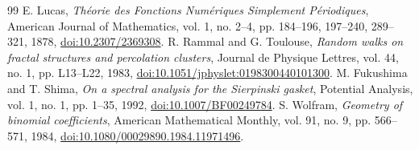\documentclass[11pt,a4paper]{article}
\theoremstyle{plain}
\theoremstyle{definition}
\theoremstyle{remark}
\numberwithin{equation}{section}
\begin{document}
\begin{thebibliography}{99}
 E. Lucas, \emph{Th\'eorie des Fonctions Num\'eriques Simplement P\'eriodiques}, American Journal of Mathematics, vol. 1, no. 2--4, pp. 184--196, 197--240, 289--321, 1878, \href{https://doi.org/10.2307/2369308}{doi:10.2307/2369308}.
 R. Rammal and G. Toulouse, \emph{Random walks on fractal structures and percolation clusters}, Journal de Physique Lettres, vol. 44, no. 1, pp. L13--L22, 1983, \href{https://doi.org/10.1051/jphyslet:0198300440101300}{doi:10.1051/jphyslet:0198300440101300}.
 M. Fukushima and T. Shima, \emph{On a spectral analysis for the Sierpinski gasket}, Potential Analysis, vol. 1, no. 1, pp. 1--35, 1992, \href{https://doi.org/10.1007/BF00249784}{doi:10.1007/BF00249784}.
 S. Wolfram, \emph{Geometry of binomial coefficients}, American Mathematical Monthly, vol. 91, no. 9, pp. 566--571, 1984, \href{https://doi.org/10.1080/00029890.1984.11971496}{doi:10.1080/00029890.1984.11971496}.
\end{thebibliography}
\end{document}

